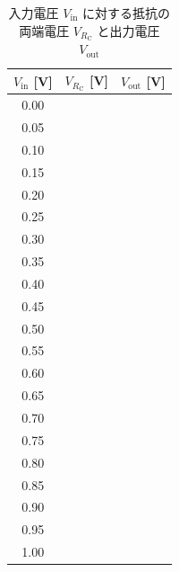 \begin{table}[h]
  \centering
  \caption{入力電圧 $V_\mathrm{in}$ に対する抵抗の両端電圧 $V_{R_\mathrm{C}}$ と出力電圧 $V_\mathrm{out}$}
  \label{tab:transistor-vin}
  \renewcommand{\arraystretch}{1.15}
  \small
  \begin{tabular}{|c|>{\centering\arraybackslash}p{7\zw}|>{\centering\arraybackslash}p{7\zw}|}
    \hline
    $V_\mathrm{in}$ [V] & $V_{R_\mathrm{C}}$ [V] & $V_\mathrm{out}$ [V] \\ \hline\hline
    0.00 & & \\ \hline
    0.05 & & \\ \hline
    0.10 & & \\ \hline
    0.15 & & \\ \hline
    0.20 & & \\ \hline
    0.25 & & \\ \hline
    0.30 & & \\ \hline
    0.35 & & \\ \hline
    0.40 & & \\ \hline
    0.45 & & \\ \hline
    0.50 & & \\ \hline
    0.55 & & \\ \hline
    0.60 & & \\ \hline
    0.65 & & \\ \hline
    0.70 & & \\ \hline
    0.75 & & \\ \hline
    0.80 & & \\ \hline
    0.85 & & \\ \hline
    0.90 & & \\ \hline
    0.95 & & \\ \hline
    1.00 & & \\ \hline
  \end{tabular}
\end{table}

\freenotepage
